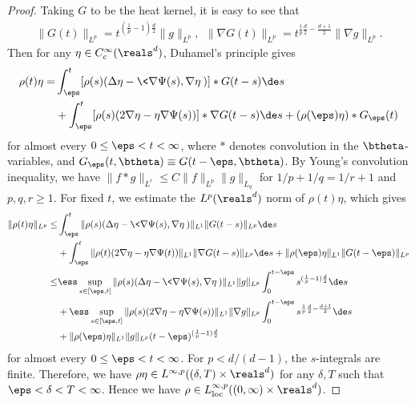 \documentclass[11pt]{article}
\begin{document}
\begin{proof}
Taking $G$ to be the heat kernel, it is easy to see that 
\[
\begin{aligned}
\| G(t) \|_{L^p} = t^{(\frac{1}{p} - 1)\frac{d}{2}} \| g \|_{L^p}, ~~
\| \nabla G(t) \|_{L^p} = t^{\frac{1}{p}\frac{d}{2} - \frac{d + 1}{2}} \| \nabla g \|_{L^p}. 
\end{aligned}
\]
Then for any $\eta \in C_c^\infty(\reals^d)$, Duhamel's principle gives 
\begin{equation}\label{eqn:Duhamel_regularity}
\begin{aligned}
\rho(t) \eta =&  \int_{\eps}^{t} [\rho(s) (\Delta \eta - \< \nabla \Psi(s), \nabla \eta\> )] * G(t - s) \de s \\
&+ \int_{\eps}^{t} [\rho(s) (2 \nabla \eta - \eta \nabla \Psi(s))] * \nabla G(t - s) \de s  + (\rho(\eps) \eta ) * G_\eps(t)
\end{aligned}
\end{equation}
for almost every $0 \le \eps < t < \infty$, where $*$ denotes convolution in the $\btheta$-variables, and $G_\eps(t, \btheta) \equiv G(t - \eps, \btheta)$. 
By Young's convolution inequality, we have $\| f * g \|_{L^r} \le C \| f \|_{L^p} \| g \|_{L_q}$ for $1/p + 1/q = 1/r + 1$ and $p, q, r \ge 1$. For fixed $t$, we estimate the $L^p(\reals^d)$ norm of $\rho(t) \eta$, which gives 
\[
\begin{aligned}
\| \rho(t) \eta \|_{L^p} \le& \int_{\eps}^{t} \| \rho(s) (\Delta \eta - \< \nabla \Psi(s), \nabla \eta\>) \|_{L^1} \| G(t - s) \|_{L^p} \de s\\
&+ \int_{\eps}^{t} \| \rho(t) (2 \nabla \eta - \eta \nabla \Psi(t))\|_{L^1} \| \nabla G(t - s) \|_{L^p} \de s + \| \rho(\eps) \eta \|_{L^1} \| G(t - \eps)\|_{L^p}\\
\le&\ess\sup_{s \in [\eps, t]} \| \rho(s) (\Delta \eta - \< \nabla \Psi(s), \nabla \eta\> ) \|_{L^1} \| g\|_{L^p} \int_{0}^{t - \eps} s^{(\frac{1}{p} - 1) \frac{d}{2}} \de s \\
&+ \ess\sup_{s \in [\eps, t]} \| \rho(s) (2 \nabla \eta - \eta \nabla \Psi(s))\|_{L^1} \| \nabla g \|_{L^p}\int_{0}^{t - \eps} s^{\frac{1}{p} \frac{d}{2} - \frac{d+1}{2}} \de s  \\
&+ \| \rho(\eps) \eta \|_{L^1} \| g \|_{L^p} (t - \eps)^{(\frac{1}{p} -1) \frac{d}{2}}\\
\end{aligned}
\]
for almost every $0 \le \eps < t < \infty$. For $p < d/(d-1)$, the $s$-integrals are finite. Therefore, we have $\rho \eta \in L^{\infty, p}( (\delta, T) \times \reals^d )$ for any $\delta, T$ such that $\eps < \delta < T < \infty$. Hence we have $\rho \in L^{\infty, p}_{\rm loc}((0,\infty)\times \reals^d)$. 


\end{proof}
\end{document}
